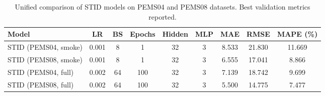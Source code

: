 \documentclass{article}
\begin{document}
\begin{table}[htbp]
\centering
\caption{Unified comparison of STID models on PEMS04 and PEMS08 datasets. Best validation metrics reported.}
\label{tab:unified_results}
\small
\begin{adjustbox}{max width=\textwidth}
\begin{tabular}{lcccccccc}
\toprule
\textbf{Model} & \textbf{LR} & \textbf{BS} & \textbf{Epochs} & \textbf{Hidden} & \textbf{MLP} & \textbf{MAE} & \textbf{RMSE} & \textbf{MAPE (\%)} \\
\midrule
STID (PEMS04, smoke) & 0.001 & 8 & 1 & 32 & 3 & 8.533 & 21.830 & 11.669 \\
STID (PEMS08, smoke) & 0.001 & 8 & 1 & 32 & 3 & 6.555 & 17.041 & 8.866 \\
STID (PEMS04, full) & 0.002 & 64 & 100 & 32 & 3 & 7.139 & 18.742 & 9.699 \\
STID (PEMS08, full) & 0.002 & 64 & 100 & 32 & 3 & 5.500 & 14.775 & 7.477 \\
\bottomrule
\end{tabular}
\end{adjustbox}
\end{table}
\end{document}
